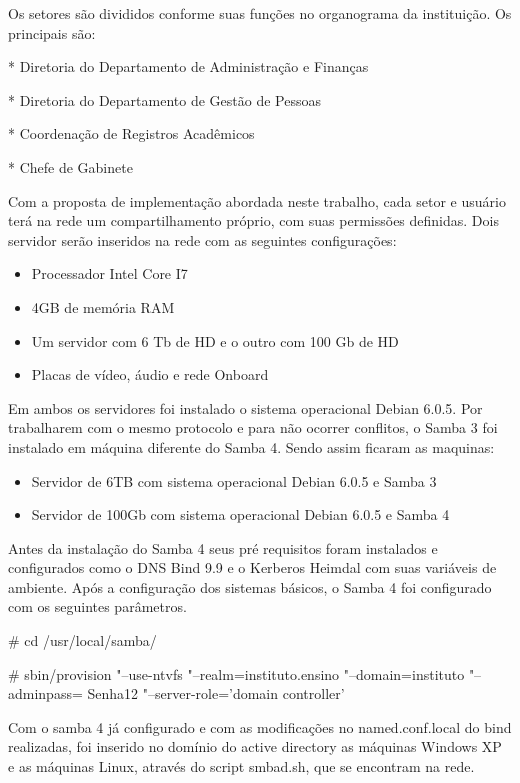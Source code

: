 Os setores são divididos conforme suas funções no organograma da instituição. Os principais são:

* Diretoria do Departamento de Administração e Finanças

* Diretoria do Departamento de Gestão de Pessoas

* Coordenação de Registros Acadêmicos

* Chefe de Gabinete

Com a proposta de implementação abordada neste trabalho, cada setor e usuário terá na rede um compartilhamento próprio, com suas permissões definidas. Dois servidor serão inseridos na rede com as seguintes configurações:

\begin{itemize}
	\item{Processador Intel Core I7\textregistered}
	\item{4GB de memória RAM}
	\item{Um servidor com 6 Tb de HD e o outro com 100 Gb de HD}
	\item{Placas de vídeo, áudio e rede Onboard}
\end{itemize}

Em ambos os servidores foi instalado o sistema operacional Debian 6.0.5. Por trabalharem com o mesmo protocolo e para não ocorrer conflitos, o Samba 3 foi instalado em máquina diferente do Samba 4. Sendo assim ficaram as maquinas:

\begin{itemize}
	\item{Servidor de 6TB com sistema operacional Debian 6.0.5 e Samba 3}
	\item{Servidor de 100Gb com sistema operacional Debian 6.0.5 e Samba 4}
\end{itemize}

Antes da instalação do Samba 4 seus pré requisitos foram instalados e configurados como o DNS Bind 9.9 e o Kerberos Heimdal com suas variáveis de ambiente.
Após a configuração dos sistemas básicos, o Samba 4 foi configurado com os seguintes parâmetros.

\# cd /usr/local/samba/

\# sbin/provision "--use-ntvfs "--realm=instituto.ensino "--domain=instituto "--adminpass= Senha12 "--server-role=’domain controller’

Com o samba 4 já configurado e com as modificações no named.conf.local do bind realizadas, foi inserido no domínio do active directory  as máquinas Windows XP e as máquinas Linux, através do script smbad.sh, que se encontram na rede.

